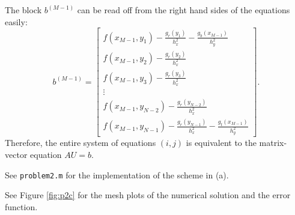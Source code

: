 \documentclass{homework}
\begin{document}
\begin{alphaparts}
\begin{equation*}
		\end{equation*}
		The block $b^{(M-1)}$ can be read off from the right hand sides of the equations easily:
		\begin{equation*}
			b^{(M-1)} = \left[\begin{matrix}
				f(x_{M-1},y_1) - \frac{g_r(y_1)}{h_x^2} - \frac{g_b(x_{M-1})}{h_y^2} \\
				f(x_{M-1},y_2) - \frac{g_r(y_2)}{h_x^2} \\
				f(x_{M-1},y_3) - \frac{g_r(y_3)}{h_x^2} \\
				\vdots \\
				f(x_{M-1},y_{N-2}) - \frac{g_r(y_{N-2})}{h_x^2}\\
				f(x_{M-1},y_{N-1}) - \frac{g_r(y_{N-1})}{h_x^2} - \frac{g_t(x_{M-1})}{h_y^2}
			\end{matrix}\right].
		\end{equation*}
		Therefore, the entire system of equations $(i,j)$ is equivalent to the matrix-vector equation $AU = b$.
		
		\questionpart See \texttt{problem2.m} for the implementation of the scheme in (a).
		
		
		
		\questionpart See Figure \ref{fig:p2c} for the mesh plots of the numerical solution and the error function.
		

\end{alphaparts}
\end{document}
